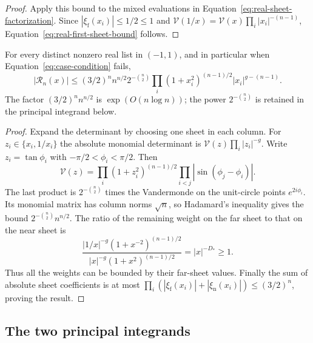 \begin{proof}
Apply this bound to the mixed evaluations in
Equation~\eqref{eq:real-sheet-factorization}. Since
$|\xi_{\mathrm f}(x_i)|\le1/2\le1$ and
$\mathcal V(1/x)=\mathcal V(x)\prod_i|x_i|^{-(n-1)}$,
Equation~\eqref{eq:real-first-sheet-bound} follows.
\end{proof}

\begin{proposition}\label{prop:second-sheet-bound}
For every distinct nonzero real list in $(-1,1)$, and in particular
when Equation~\eqref{eq:case-condition} fails,
\begin{equation}\label{eq:real-second-sheet-bound}
 |\mathcal R_n(x)|\le
 (3/2)^n n^{n/2}2^{-\binom n2}
 \prod_i(1+x_i^2)^{(n-1)/2}|x_i|^{g-(n-1)}.
\end{equation}
The factor $(3/2)^n n^{n/2}$ is $\exp(O(n\log n))$; the power
$2^{-\binom n2}$ is retained in the principal integrand below.
\end{proposition}

\begin{proof}
Expand the determinant by choosing one sheet in each column.  For
$z_i\in\{x_i,1/x_i\}$ the absolute monomial determinant is
$\mathcal V(z)\prod_i|z_i|^{-g}$.  Write
$z_i=\tan\phi_i$ with $-\pi/2<\phi_i<\pi/2$.  Then
\[
 \mathcal V(z)=\prod_i(1+z_i^2)^{(n-1)/2}
              \prod_{i<j}|\sin(\phi_j-\phi_i)|.
\]
The last product is $2^{-\binom n2}$ times the Vandermonde on
the unit-circle points $e^{2i\phi_i}$.  Its monomial matrix has
column norms $\sqrt n$, so Hadamard's inequality \cite{Hadamard1893} gives the bound
$2^{-\binom n2}n^{n/2}$.  The ratio of the remaining weight on
the far sheet to that on the near sheet is
\[
 \frac{|1/x|^{-g}(1+x^{-2})^{(n-1)/2}}
      {|x|^{-g}(1+x^2)^{(n-1)/2}}
 =|x|^{-D_*}\ge1.
\]
Thus all the weights can be bounded by their far-sheet values.
Finally the sum of absolute sheet coefficients is at most
$\prod_i(|\xi_{\mathrm f}(x_i)|+|\xi_{\mathrm n}(x_i)|)
\le(3/2)^n$, proving the result.
\end{proof}

\subsection{The two principal integrands}

